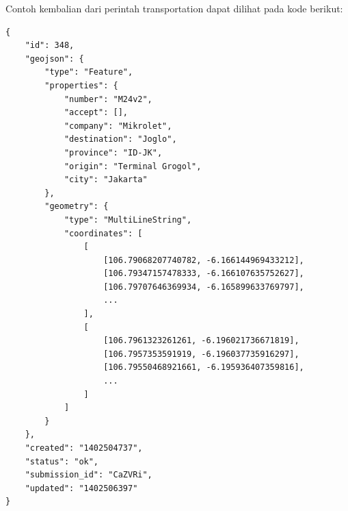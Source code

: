 Contoh kembalian dari perintah transportation dapat dilihat pada kode berikut:

\begin{lstlisting}
{
	"id": 348,
	"geojson": {
		"type": "Feature",
		"properties": {
			"number": "M24v2",
			"accept": [],
			"company": "Mikrolet",
			"destination": "Joglo",
			"province": "ID-JK",
			"origin": "Terminal Grogol",
			"city": "Jakarta"
		},
		"geometry": {
			"type": "MultiLineString",
			"coordinates": [
				[
					[106.79068207740782, -6.166144969433212],
					[106.79347157478333, -6.166107635752627],
					[106.79707646369934, -6.165899633769797],
					...
				],
				[
					[106.7961323261261, -6.196021736671819],
					[106.7957353591919, -6.196037735916297],
					[106.79550468921661, -6.195936407359816],
					...
				]
			]
		}
	},
	"created": "1402504737",
	"status": "ok",
	"submission_id": "CaZVRi",
	"updated": "1402506397"
}
\end{lstlisting}
